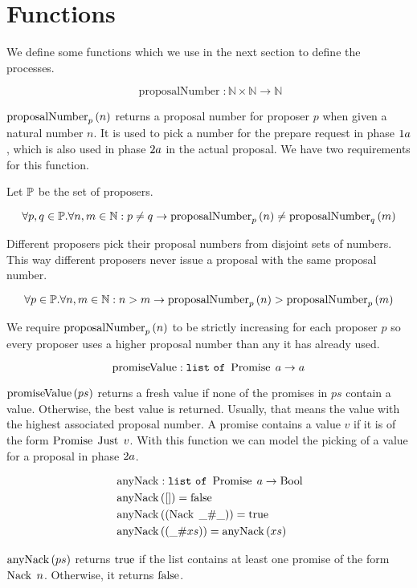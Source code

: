 \section{Functions}
We define some functions which we use in the next section to define the processes.

\[\operatorname{proposalNumber} : \mathbb{N} \times \mathbb{N} \to \mathbb{N}\]

$\proposalNumber{n}{p}$ returns a proposal number for proposer $p$ when given a natural number $n$.
It is used to pick a number for the prepare request in phase $\POneA$, which is also used in phase $\PTwoA$ in the actual proposal.
We have two requirements for this function.

Let $\SetOfProposers$ be the set of proposers.

\[\forall p,q \in \SetOfProposers . \forall n,m \in \mathbb{N}: p \neq q \to \proposalNumber{n}{p} \neq \proposalNumber{m}{q}\]

Different proposers pick their proposal numbers from disjoint sets of numbers.
This way different proposers never issue a proposal with the same proposal number.

\[\forall p \in \SetOfProposers . \forall n,m \in \mathbb{N}: n > m \to \proposalNumber{n}{p} > \proposalNumber{m}{p}\]

We require $\proposalNumber{n}{p}$ to be strictly increasing for each proposer $p$ so every proposer uses a higher proposal number than any it has already used.

\[\operatorname{promiseValue} : \List{\Promise{a}} \to a\]

$\promiseValue{ps}$ returns a fresh value if none of the promises in $ps$ contain a value. Otherwise, the best value is returned. Usually, that means the value with the highest associated proposal number.
A promise contains a value $v$ if it is of the form $\Promise{\Just{v}}$.
With this function we can model the picking of a value for a proposal in phase $\PTwoA$.

\begin{align*}
&\operatorname{anyNack} : \List{\Promise{a}} \to \Bool\\
&\anyNack{\EmptyList} = \False\\
&\anyNack{\ListPattern{\Nack{\Wildcard}}{\Wildcard}} = \True\\
&\anyNack{\ListPattern{\Wildcard}{xs}} = \anyNack{xs}
\end{align*}

$\anyNack{ps}$ returns $\True$ if the list contains at least one promise of the form $\Nack{n}$.
Otherwise, it returns $\False$.

